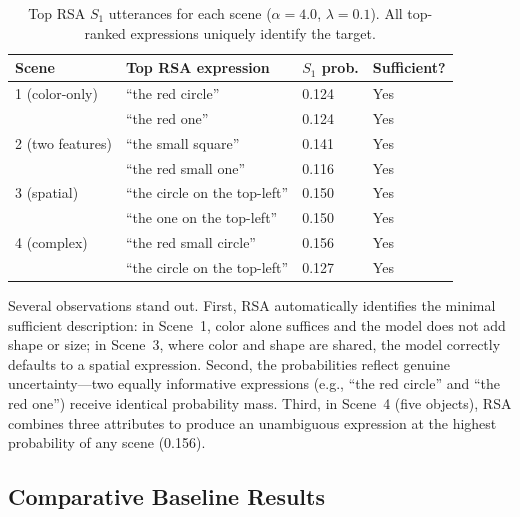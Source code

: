 \documentclass[10pt]{article}
\begin{document}
\vspace{-3mm}
\begin{table}[h]
\centering
\small
\begin{tabular}{lp{5.5cm}ll}
\toprule
Scene & Top RSA expression & $S_1$ prob. & Sufficient? \\
\midrule
1 (color-only) & ``the red circle'' & 0.124 & Yes \\
               & ``the red one''    & 0.124 & Yes \\
2 (two features) & ``the small square'' & 0.141 & Yes \\
                 & ``the red small one'' & 0.116 & Yes \\
3 (spatial)      & ``the circle on the top-left'' & 0.150 & Yes \\
                 & ``the one on the top-left'' & 0.150 & Yes \\
4 (complex)      & ``the red small circle'' & 0.156 & Yes \\
                 & ``the circle on the top-left'' & 0.127 & Yes \\
\bottomrule
\end{tabular}
\vspace{-3mm}
\caption{Top RSA $S_1$ utterances for each scene ($\alpha{=}4.0$, $\lambda{=}0.1$). All top-ranked expressions uniquely identify the target.}
\label{tab:rsa}
\vspace{-4mm}
\end{table}

Several observations stand out. First, RSA automatically identifies the minimal sufficient description: in Scene~1, color alone suffices and the model does not add shape or size; in Scene~3, where color and shape are shared, the model correctly defaults to a spatial expression. Second, the probabilities reflect genuine uncertainty---two equally informative expressions (e.g., ``the red circle'' and ``the red one'') receive identical probability mass. Third, in Scene~4 (five objects), RSA combines three attributes to produce an unambiguous expression at the highest probability of any scene (0.156).

\subsection{Comparative Baseline Results}
\end{document}
